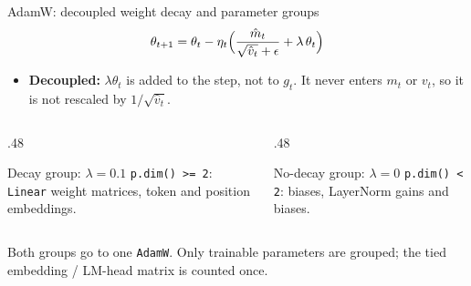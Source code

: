 \documentclass[handout]{beamer}
\begin{document}
\begin{frame}{AdamW: decoupled weight decay and parameter groups}
  \[
    \theta_{t+1}=\theta_t-\eta_t\Bigl(\frac{\hat m_t}{\sqrt{\hat v_t}+\epsilon}+\lambda\,\theta_t\Bigr)
  \]
  \begin{itemize}
    \item \textbf{Decoupled:} $\lambda\theta_t$ is added to the step, not to $g_t$. It never enters $m_t$ or $v_t$, so it is not rescaled by $1/\sqrt{\hat v_t}$.
  \end{itemize}
  \vspace{2pt}
  \begin{columns}[t]
    \begin{column}{.48\linewidth}
      \begin{block}{Decay group: $\lambda=0.1$}
        \texttt{p.dim() >= 2}: \texttt{Linear} weight matrices, token and position embeddings.
      \end{block}
    \end{column}
    \begin{column}{.48\linewidth}
      \begin{block}{No-decay group: $\lambda=0$}
        \texttt{p.dim() < 2}: biases, LayerNorm gains and biases.
      \end{block}
    \end{column}
  \end{columns}
  \vspace{6pt}
  {\footnotesize Both groups go to one \texttt{AdamW}. Only trainable parameters are grouped; the tied embedding / LM-head matrix is counted once.}
\end{frame}
\end{document}
